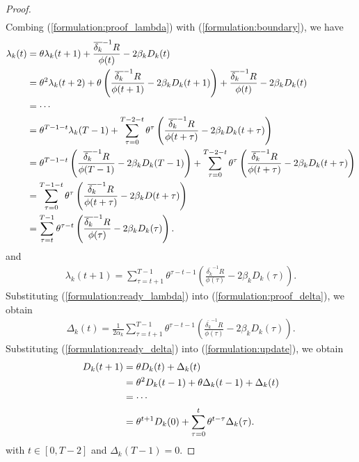 \documentclass{article}
\theoremstyle{plain}
\theoremstyle{definition}
\theoremstyle{remark}
\begin{document}
\begin{proof}
\begin{align}
    \end{align}
    Combing (\ref{formulation:proof_lambda}) with (\ref{formulation:boundary}), we have
    \begin{align}
      \lambda_k(t) & = \theta \lambda_k(t+1) + \frac{\overline{\delta_k}^{-1}R}{\phi(t)} - 2\beta_k D_k(t) \notag \\
                  & = \theta^2 \lambda_k(t+2) + \theta\left(\frac{\overline{\delta_k}^{-1}R}{\phi(t+1)} - 2\beta_kD_k(t+1)\right) + \frac{\overline{\delta_k}^{-1}R}{\phi(t)} - 2\beta_kD_k(t) \notag \\
                  & = \cdots \notag \\
                  & = \theta^{T-1-t} \lambda_k(T-1) + \sum_{\tau=0}^{T-2-t} \theta^{\tau} \left(\frac{\overline{\delta_k}^{-1}R}{\phi(t + \tau)} - 2\beta_kD_k(t + \tau)\right) \notag \\
                  & = \theta^{T-1-t} \left(\frac{\overline{\delta_k}^{-1}R}{\phi(T-1)} - 2\beta_k D_k(T-1)\right) + \sum_{\tau=0}^{T-2-t} \theta^{\tau} \left(\frac{\overline{\delta_k}^{-1}R}{\phi(t + \tau)} - 2\beta_k D_k(t + \tau)\right) \notag \\
                  & = \sum_{\tau = 0}^{T - 1 - t} \theta^{\tau} \left(\frac{\overline{\delta_k}^{-1}R}{\phi(t + \tau)} - 2\beta_k D(t + \tau)\right) \notag \\
                  & = \sum_{\tau = t}^{T - 1} \theta^{\tau - t} \left(\frac{\overline{\delta_k}^{-1}R}{\phi(\tau)} - 2\beta_k D_k(\tau)\right).
    \end{align}
    and 
    \begin{align}
      \label{formulation:ready_lambda}
      \lambda_k(t+1) = \sum_{\tau = t + 1}^{T - 1} \theta^{\tau - t - 1} \left(\frac{\overline{\delta_k}^{-1}R}{\phi(\tau)} - 2\beta_k D_k(\tau)\right).
    \end{align}
    Substituting (\ref{formulation:ready_lambda}) into (\ref{formulation:proof_delta}), we obtain
    \begin{align}
      \label{formulation:ready_delta}
      \Delta_k(t) = \frac{1}{2 \alpha_k} \sum_{\tau = t + 1}^{T - 1} \theta^{\tau - t - 1} \left(\frac{\overline{\delta_k}^{-1}R}{\phi(\tau)} - 2\beta_k D_k(\tau)\right).
    \end{align}
    Substituting (\ref{formulation:ready_delta}) into (\ref{formulation:update}), we obtain
    \begin{align}
      D_k(t+1) & = \theta D_k(t) + \Delta_k(t) \notag \\
            & = \theta^2 D_k(t-1) + \theta \Delta_k(t-1) + \Delta_k(t) \notag \\
            & = \cdots \notag \\
            & = \theta^{t+1} D_k(0) + \sum_{\tau = 0}^{t} \theta^{t-\tau} \Delta_k(\tau).
    \end{align}
    with $t \in [0, T-2]$ and $\Delta_k(T-1) = 0$.
  \end{proof}
\end{document}
